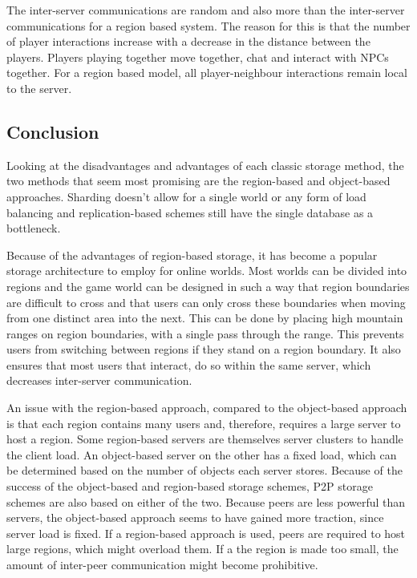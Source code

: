 The inter-server communications are random and also more than the inter-server communications for a region based system. The reason for this is that the number of player interactions increase with a decrease in the distance
between the players. Players playing together move together, chat and interact with NPCs together. For a region based model, all player-neighbour interactions remain local to the server.

\subsection{Conclusion}

Looking at the disadvantages and advantages of each classic storage method, the two methods that seem most promising are the region-based and object-based approaches. Sharding doesn't allow for a single world or any form of load balancing and replication-based schemes still have the single database as a bottleneck.

Because of the advantages of region-based storage, it has become a popular storage architecture to employ for online worlds. Most worlds can be divided into regions and the game world can be designed in such a way that region boundaries are difficult to cross and that users can only cross these boundaries when moving from one distinct area into the next. This can be done by placing high mountain ranges on region boundaries, with a single pass through the range. This prevents users from switching between regions if they stand on a region boundary. It also ensures that most users that interact, do so within the same server, which decreases inter-server communication.

An issue with the region-based approach, compared to the object-based approach is that each region contains many users and, therefore, requires a large server to host a region. Some region-based servers are themselves server clusters to handle the client load. An object-based server on the other has a fixed load, which can be determined based on the number of objects each server stores.
Because of the success of the object-based and region-based storage schemes, P2P storage schemes are also based on either of the two. Because peers are less powerful than servers, the object-based approach seems to have gained more traction, since server load is fixed. If a region-based approach is used, peers are required to host large regions, which might overload them. If a the region is made too small, the amount of inter-peer communication might become prohibitive.

